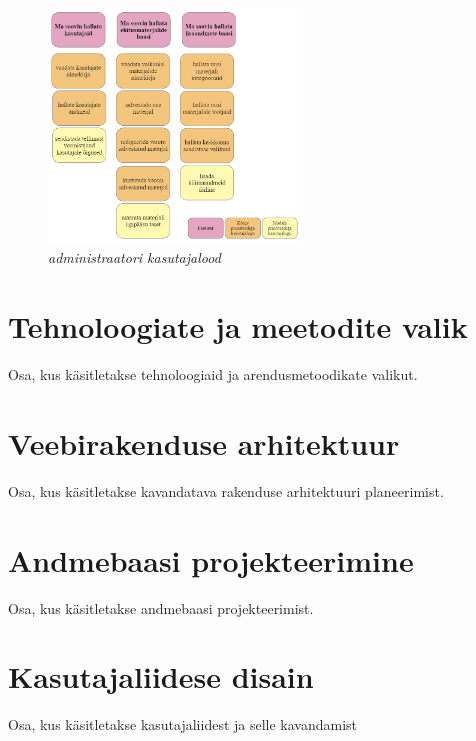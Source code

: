 \begin{figure}[ht]
    \centering
    \includegraphics[width=0.6\textwidth]{figures/analysis/admin_userstories.png}
    \caption[Funktsionaalsed nõuded, administraatori kasutajalood]{\textit{administraatori kasutajalood}}
    \label{fig:admin_userstories}
\end{figure}


\section{Tehnoloogiate ja meetodite valik}
Osa, kus käsitletakse tehnoloogiaid ja arendusmetoodikate valikut.

\section{Veebirakenduse arhitektuur}
Osa, kus käsitletakse kavandatava rakenduse arhitektuuri planeerimist.

\section{Andmebaasi projekteerimine}
Osa, kus käsitletakse andmebaasi projekteerimist.

\section{Kasutajaliidese disain}
Osa, kus käsitletakse kasutajaliidest ja selle kavandamist